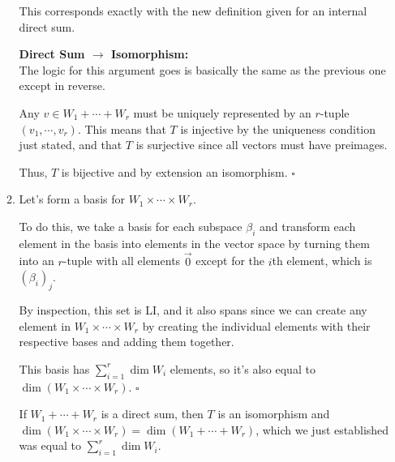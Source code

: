 \documentclass[12pt]{article}
\begin{document}
\begin{enumerate}
\begin{enumerate}
                        This corresponds exactly with the new definition given for an internal direct sum.

                        \textbf{Direct Sum $\rightarrow$ Isomorphism:} \\
                        The logic for this argument goes is basically the same as the previous one except in reverse.

                        Any $v \in W_1 + \cdots + W_r$ must be uniquely represented by an $r$-tuple $(v_1, \cdots, v_r)$.
                        This means that $T$ is injective by the uniqueness condition just stated,
                        and that $T$ is surjective since all vectors must have preimages.

                        Thus, $T$ is bijective and by extension an isomorphism. $\square$
                  \item Let's form a basis for $W_1 \times \cdots \times W_r$.

                        To do this, we take a basis for each subspace $\beta_i$ and transform each element in the basis into elements in the vector space
                        by turning them into an $r$-tuple with all elements $\vec{0}$ except for the $i$th element, which is $(\beta_i)_j$.

                        By inspection, this set is LI, and it also spans since we can create any element in $W_1 \times \cdots \times W_r$
                        by creating the individual elements with their respective bases and adding them together.

                        This basis has $\sum_{i=1}^{r} \dim W_i$ elements, so it's also equal to $\dim (W_1 \times \cdots \times W_r)$. $\square$

                        If $W_1 + \cdots + W_r$ is a direct sum, then $T$ is an isomorphism and $\dim (W_1 \times \cdots \times W_r)=\dim (W_1 + \cdots + W_r)$,
                        which we just established was equal to $\sum_{i=1}^{r} \dim W_i$.
            \end{enumerate}
\end{enumerate}
\end{document}
